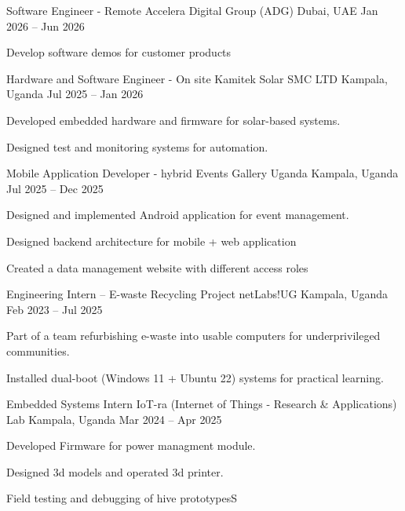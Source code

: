     
    \begin{cventries}
    
      \cventry
        {Software Engineer - Remote}
        {Accelera Digital Group (ADG)}
        {Dubai, UAE}
        {Jan 2026 -- Jun 2026}
        {
          \begin{cvitems}
            \item Develop software demos for customer products
          \end{cvitems}
        }
        
      \cventry
        {Hardware and Software Engineer - On site}
        {Kamitek Solar SMC LTD}
        {Kampala, Uganda}
        {Jul 2025 -- Jan 2026}
        {
          \begin{cvitems}
            \item Developed embedded hardware and firmware for solar-based systems.
            \item Designed test and monitoring systems for automation.
          \end{cvitems}
        }
    
      \cventry
        {Mobile Application Developer - hybrid}
        {Events Gallery Uganda}
        {Kampala, Uganda}
        {Jul 2025 -- Dec 2025}
        {
          \begin{cvitems}
            \item Designed and implemented Android application for event management.
            \item Designed backend architecture for mobile + web application
            \item Created a data management website with different access roles
          \end{cvitems}
        }
    
    
      \cventry
        {Engineering Intern – E-waste Recycling Project}
        {netLabs!UG}
        {Kampala, Uganda}
        {Feb 2023 -- Jul 2025}
        {
          \begin{cvitems}
            \item Part of a team refurbishing e-waste into usable computers for underprivileged communities.
            \item Installed dual-boot (Windows 11 + Ubuntu 22) systems for practical learning.
          \end{cvitems}
        }
    
      \cventry
        {Embedded Systems Intern}
        {IoT-ra (Internet of Things - Research \& Applications) Lab}
        {Kampala, Uganda}
        {Mar 2024 -- Apr 2025}
        {
          \begin{cvitems}
            \item Developed Firmware for power managment module.
            \item Designed 3d models and operated 3d printer.
            \item Field testing and debugging of hive prototypesS
          \end{cvitems}
        }
    

\end{cventries}

